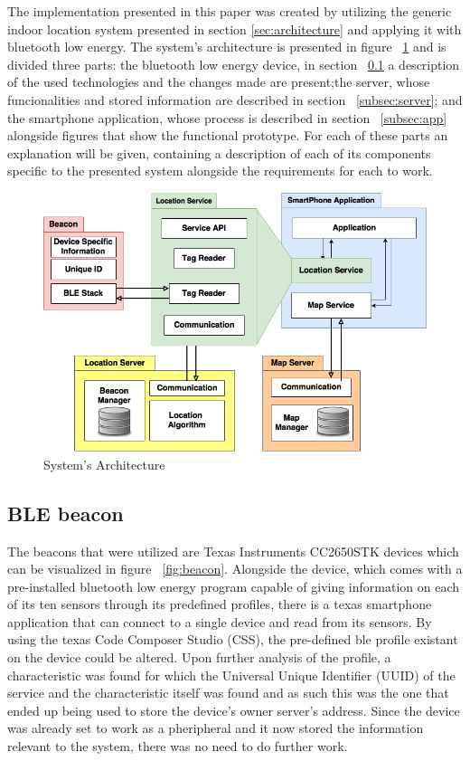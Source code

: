\documentclass[a4paper]{IEEEtran}
\begin{document}
The implementation presented in this paper was created by utilizing the generic indoor location system presented in section \ref{sec:architecture} and applying it with bluetooth low energy. The system's architecture is presented in figure ~\ref{fig:implementation} and is divided three parts: the bluetooth low energy device, in section ~\ref{subsec:beacon} a description of the used technologies and the changes made are present;the server, whose funcionalities and stored information are described in section ~\ref{subsec:server}; and the smartphone application, whose process is described in section ~\ref{subsec:app} alongside figures that show the functional prototype. For each of these parts an explanation will be given, containing a description of each of its components specific to the presented system alongside the requirements for each to work.

\begin{figure}
	\centering
		\includegraphics[width=1\linewidth]{figures/implementation.png}
	\caption[System's Architecture]{System's Architecture}
	\label{fig:implementation}
\end{figure}

\subsection{ BLE beacon}
\label{subsec:beacon}

The beacons that were utilized are Texas Instruments CC2650STK devices which can be visualized in figure ~\ref{fig:beacon}. Alongside the device, which comes with a pre-installed bluetooth low energy program capable of giving information on each of its ten sensors through its predefined profiles, there is a texas smartphone application that can connect to a single device and read from its sensors. By using the texas Code Composer Studio (CSS), the pre-defined ble profile existant on the device could be altered. Upon further analysis of the profile, a characteristic was found for which the Universal Unique Identifier (UUID) of the service and the characteristic itself was found and as such this was the one that ended up being used to store the device's owner server's address. Since the device was already set to work as a pheripheral and it now stored the information relevant to the system, there was no need to do further work.
\end{document}
